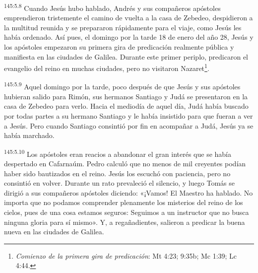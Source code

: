 \par
\textsuperscript{145:5.8} Cuando Jesús hubo hablado, Andrés y sus compañeros apóstoles emprendieron tristemente el camino de vuelta a la casa de Zebedeo, despidieron a la multitud reunida y se prepararon rápidamente para el viaje, como Jesús les había ordenado. Así pues, el domingo por la tarde 18 de enero del año 28, Jesús y los apóstoles empezaron su primera gira de predicación realmente pública y manifiesta en las ciudades de Galilea. Durante este primer periplo, predicaron el evangelio del reino en muchas ciudades, pero no visitaron Nazaret\footnote{\textit{Comienzo de la primera gira de predicación}: Mt 4:23; 9:35b; Mc 1:39; Lc 4:44.}.

\par
\textsuperscript{145:5.9} Aquel domingo por la tarde, poco después de que Jesús y sus apóstoles hubieran salido para Rimón, sus hermanos Santiago y Judá se presentaron en la casa de Zebedeo para verlo. Hacia el mediodía de aquel día, Judá había buscado por todas partes a su hermano Santiago y le había insistido para que fueran a ver a Jesús. Pero cuando Santiago consintió por fin en acompañar a Judá, Jesús ya se había marchado.

\par
\textsuperscript{145:5.10} Los apóstoles eran reacios a abandonar el gran interés que se había despertado en Cafarnaúm. Pedro calculó que no menos de mil creyentes podían haber sido bautizados en el reino. Jesús los escuchó con paciencia, pero no consintió en volver. Durante un rato prevaleció el silencio, y luego Tomás se dirigió a sus compañeros apóstoles diciendo: «¡Vamos! El Maestro ha hablado. No importa que no podamos comprender plenamente los misterios del reino de los cielos, pues de una cosa estamos seguros: Seguimos a un instructor que no busca ninguna gloria para sí mismo». Y, a regañadientes, salieron a predicar la buena nueva en las ciudades de Galilea.